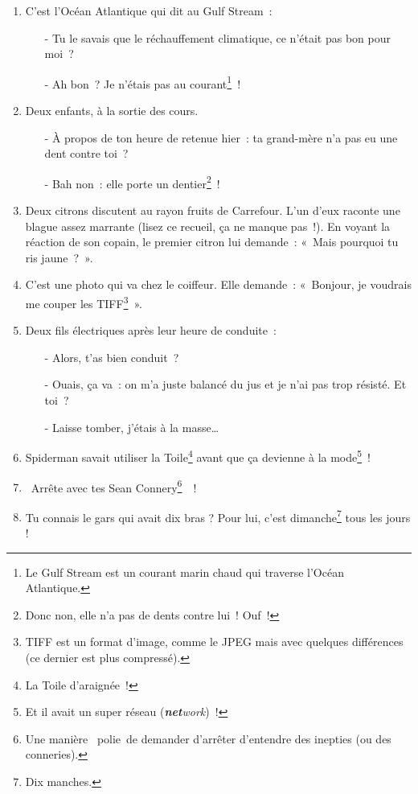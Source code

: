 \documentclass[10pt,a5paper,fullpage]{book}
\begin{document}
\begin{enumerate}
		\item C’est l’Océan Atlantique qui dit au Gulf Stream~:
		\begin{itemize}	
			\item[-] Tu le savais que le réchauffement climatique, ce n’était pas bon pour moi~?
			\item[-] Ah bon~? Je n’étais pas au courant\footnote{Le Gulf Stream est un courant marin chaud qui traverse l’Océan Atlantique.}~!
		\end{itemize}
		\item Deux enfants, à la sortie des cours. 
		\begin{itemize}
			\item[-] À propos de ton heure de retenue hier~: ta grand-mère n’a pas eu une dent contre toi~?
			\item[-] Bah non~: elle porte un dentier\footnote{Donc non, elle n'a pas de dents contre lui~! Ouf~!}~!  
		\end{itemize}
		\item Deux citrons discutent au rayon fruits de Carrefour. L’un d’eux raconte une blague assez marrante (lisez ce recueil, ça ne manque pas~!). En voyant la réaction de son copain, le premier citron lui demande~: «~Mais pourquoi tu ris jaune~?~».
		\item C’est une photo qui va chez le coiffeur. Elle demande~: «~Bonjour, je voudrais me couper les TIFF\footnote{TIFF est un format d’image, comme le JPEG mais avec quelques différences (ce dernier est plus compressé).}~».
		\item Deux fils électriques après leur heure de conduite~: 
		\begin{itemize}
			\item[-] Alors, t’as bien conduit~?
			\item[-] Ouais, ça va~: on m’a juste balancé du jus et je n’ai pas trop résisté. Et toi~?
			\item[-] Laisse tomber, j’étais à la masse… 
		\end{itemize}
		\item Spiderman savait utiliser la Toile\footnote{La Toile d’araignée~!} avant que ça devienne à la mode\footnote{Et il avait un super réseau (\textit{\textbf{net}work})~!}~!
		\item \guillemotleft~Arrête avec tes Sean Connery\footnote{Une manière \guillemotleft~polie~\guillemotright de demander d'arrêter d'entendre des inepties (ou des conneries).}~\guillemotright~!
		\item Tu connais le gars qui avait dix bras ? Pour lui, c'est dimanche\footnote{Dix manches.} tous les jours !
	\end{enumerate}
	
\end{document}
